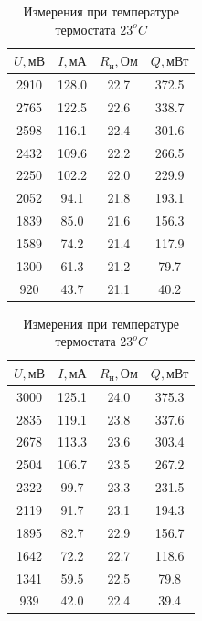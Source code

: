 \documentclass[a4paper, 12pt]{article}
\begin{document}
        \begin{table}[!ht]
            \begin{minipage}{.42\linewidth}

                \centering
                \begin{tabular}{|c|c|c|c|}
                    \hline

                    $U, мВ$ & $I, мА$ & $R_н, Ом$ & $Q, мВт$\\ \hline
                    2910 & 128.0 & 22.7 & 372.5\\ \hline
                    2765 & 122.5 & 22.6 & 338.7\\ \hline
                    2598 & 116.1 & 22.4 & 301.6\\ \hline
                    2432 & 109.6 & 22.2 & 266.5\\ \hline
                    2250 & 102.2 & 22.0 & 229.9\\ \hline
                    2052 & 94.1 & 21.8 & 193.1\\ \hline
                    1839 & 85.0 & 21.6 & 156.3\\ \hline
                    1589 & 74.2 & 21.4 & 117.9\\ \hline
                    1300 & 61.3 & 21.2 & 79.7\\ \hline
                    920 & 43.7 & 21.1 & 40.2\\ \hline

                \end{tabular}
                \caption{Измерения при температуре термостата $23^oC$}
                \label{table_23}
            \end{minipage}
            \begin{minipage}{.42\linewidth}
                \centering
                \begin{tabular}{|c|c|c|c|}
                    \hline

                    $U, мВ$ & $I, мА$ & $R_н, Ом$ & $Q, мВт$\\ \hline
                    3000 & 125.1 & 24.0 & 375.3\\ \hline
                    2835 & 119.1 & 23.8 & 337.6\\ \hline
                    2678 & 113.3 & 23.6 & 303.4\\ \hline
                    2504 & 106.7 & 23.5 & 267.2\\ \hline
                    2322 & 99.7 & 23.3 & 231.5\\ \hline
                    2119 & 91.7 & 23.1 & 194.3\\ \hline
                    1895 & 82.7 & 22.9 & 156.7\\ \hline
                    1642 & 72.2 & 22.7 & 118.6\\ \hline
                    1341 & 59.5 & 22.5 & 79.8\\ \hline
                    939 & 42.0 & 22.4 & 39.4\\ \hline


\end{tabular}
\end{minipage}
\end{table}
\end{document}
